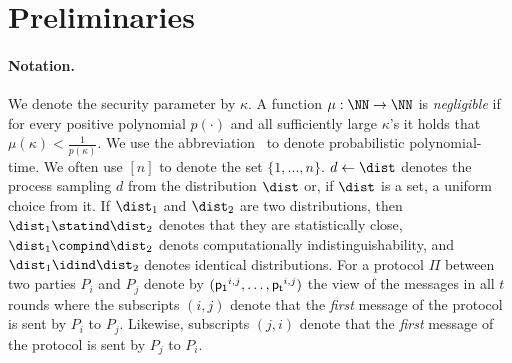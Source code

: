 \section{Preliminaries}\label{sec:prelim}
\paragraph{Notation.}
We denote the security parameter by $\kappa$. A function
$\mu:\NN\rightarrow\NN$ is {\em negligible} if for every positive
polynomial $p(\cdot)$ and all sufficiently large $\kappa$'s it holds
that $\mu(\kappa)<\frac{1}{p(\kappa)}$. We use the abbreviation
\ppt\ to denote probabilistic polynomial-time.  We often use $[n]$ to
denote the set $\{1,...,n\}$. $d \leftarrow \dist$ denotes the process
sampling $d$ from the distribution $\dist$ or, if $\dist$ is a set, a
uniform choice from it. If $\dist_1$ and $\dist_2$ are two
distributions, then $\dist_1 \statind \dist_2$ denotes that they are
statistically close, $\dist_1\compind\dist_2$ denots computationally
indistinguishability, and $ \dist_1 \idind \dist_2$ denotes identical
distributions. For a protocol $\Pi$ between two parties $P_i$ and $P_j$ denote by $({\sf{p_1}}^{i,j},\ldots, {\sf{p_t}}^{i,j})$ the view of the messages in all $t$ rounds where the subscripts $({i,j})$ denote that the \emph{first} message of the protocol is sent by $P_i$ to $P_j$. Likewise, subscripts $({j,i})$ denote that the \emph{first} message of the protocol is sent by $P_j$ to $P_i$.


\iffalse
